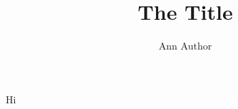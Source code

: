 \documentclass{article}
\title{The Title}\author{Ann Author}
\begin{document}
\maketitle
Hi
\end{document}
